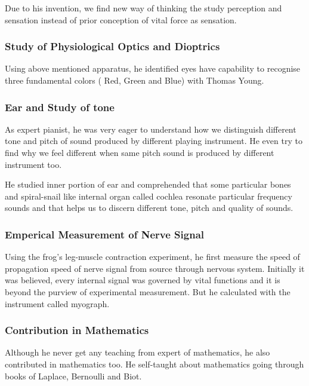 \documentclass[11pt]{article}
\begin{document}
Due to his invention, we find new way of thinking the study perception and sensation instead of prior conception of vital force as sensation.

\subsubsection{Study of Physiological Optics and Dioptrics}
Using above mentioned apparatus, he identified eyes have capability to recognise three fundamental colors ( Red, Green and  Blue) with Thomas Young.

\subsubsection{Ear and Study of tone}
As expert pianist, he was very eager to understand how we distinguish different tone and pitch of sound produced by different playing instrument. He even try to find why we feel different when same pitch sound is produced by different instrument too.

He studied inner portion of ear and comprehended that some particular bones and spiral-snail like internal organ called cochlea resonate particular frequency sounds and that helps us to discern different tone, pitch and quality of sounds.



\subsubsection{Emperical Measurement of Nerve Signal}
Using the frog's leg-muscle contraction experiment, he first measure the speed of propagation speed of nerve signal from source through nervous system.
Initially it was believed, every internal signal was governed by vital functions and it is beyond the purview of experimental measurement. But he calculated with the instrument called myograph.



\subsubsection{Contribution in Mathematics}
Although he never get any teaching from expert of mathematics, he also contributed in mathematics too. He self-taught about mathematics going through books of Laplace, Bernoulli and Biot.
\end{document}
